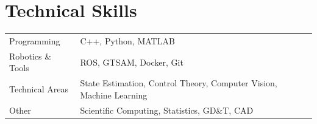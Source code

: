 \section{Technical Skills}
\begin{tabularx}{\linewidth}{@{}l X@{}}
Programming          & \normalsize{C++, Python, MATLAB} \\
Robotics \& Tools    & \normalsize{ROS, GTSAM, Docker, Git} \\
Technical Areas      & \normalsize{State Estimation, Control Theory, Computer Vision, Machine Learning} \\
Other                & \normalsize{Scientific Computing, Statistics, GD\&T, CAD} \\
\end{tabularx}
